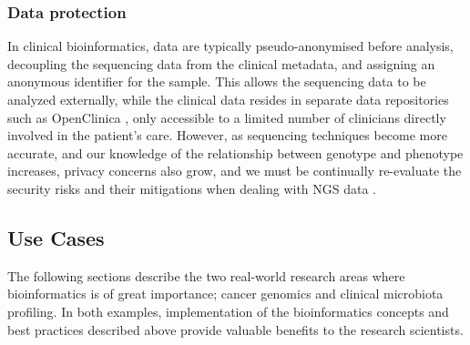 \begin{justify}
\subsubsection{Data protection}
In clinical bioinformatics, data are typically pseudo-anonymised before analysis, decoupling the sequencing data from the clinical metadata, and assigning an anonymous identifier for the sample. This allows the sequencing data to be analyzed externally, while the clinical data resides in separate data repositories such as OpenClinica \cite{cavelaars2015openclinica}, only accessible to a limited number of clinicians directly involved in the patient's care. However, as sequencing techniques become more accurate, and our knowledge of the relationship between genotype and phenotype increases, privacy concerns also grow, and we must be continually re-evaluate the security risks and their mitigations when dealing with NGS data \cite{erlich2014routes}.

\subsection{Use Cases}
The following sections describe the two real-world research areas where bioinformatics is of great importance; cancer genomics and clinical microbiota profiling. In both examples, implementation of the bioinformatics concepts and best practices described above provide valuable benefits to the research scientists.




\end{justify}
